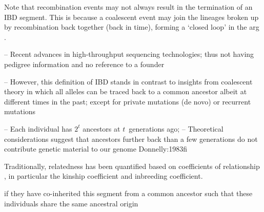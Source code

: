Note that recombination events may not always result in the termination of an IBD segment.
This is because a coalescent event may join the  lineages broken up by recombination back together (back in time), forming a `closed loop' in the \gls{arg} \citep[see][Theorem~2.4]{griffiths1997ancestral}.


-- Recent advances in high-throughput sequencing technologies; thus not having pedigree information and no reference to a founder

-- However, this definition of IBD stands in contrast to insights from coalescent theory in which all alleles can be traced back to a common ancestor albeit at different times in the past; except for private mutations (de novo) or recurrent mutations



-- Each individual has $2^t$ ancestors at $t$~generations ago;
-- Theoretical considerations suggest that ancestors further back than a few generations do not contribute genetic material to our genome {Donnelly:1983fi}



Traditionally, relatedness has been quantified based on coefficients of relationship \citep{Wright:1921tk,Wright:1922cr}, in particular the kinship coefficient and inbreeding coefficient.









if they have co-inherited this segment from a common ancestor
such that
these individuals share the same ancestral origin

